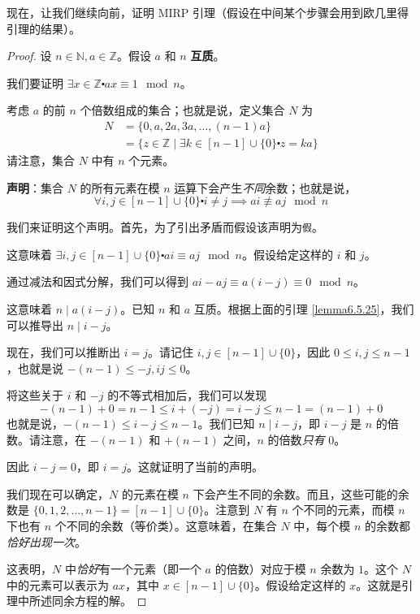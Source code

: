 现在，让我们继续向前，证明 MIRP 引理（假设在中间某个步骤会用到欧几里得引理的结果）。

\begin{proof}
    设 $n \in \mathbb{N}, a \in \mathbb{Z}$。假设 $a$ 和 $n$ \textbf{互质}。
    
    我们要证明 $\exists x \in \mathbb{Z} \centerdot ax \equiv 1 \mod n$。

    考虑 $a$ 的前 $n$ 个倍数组成的集合；也就是说，定义集合 $N$ 为
    \begin{align*}
        N &= \{0, a, 2a, 3a, \dots ,(n-1)a\} \\
        &= \{z \in \mathbb{Z} \mid \exists k \in [n - 1] \cup \{0\} \centerdot z = ka\}
    \end{align*}
    请注意，集合 $N$ 中有 $n$ 个元素。

    \textbf{声明}：集合 $N$ 的所有元素在模 $n$ 运算下会产生\emph{不同}余数；也就是说，
    \[\forall i, j \in [n-1] \cup \{0\} \centerdot i \ne j \implies ai \not\equiv aj \mod n\]

    我们来证明这个声明。首先，为了引出矛盾而假设该声明为\verb|假|。

    这意味着 $\exists i, j \in [n-1] \cup \{0\} \centerdot ai \equiv aj \mod n$。假设给定这样的 $i$ 和 $j$。

    通过减法和因式分解，我们可以得到 $ai - aj \equiv a(i-j) \equiv 0 \mod n$。

    这意味着 $n \mid a(i-j)$。已知 $n$ 和 $a$ 互质。根据上面的引理 \ref{lemma6.5.25}，我们可以推导出 $n \mid i-j$。

    现在，我们可以推断出 $i = j$。请记住 $i, j \in [n-1] \cup \{0\}$，因此 $0 \le i, j \le n-1$，也就是说 $-(n-1) \le -j, ij \le 0$。

    将这些关于 $i$ 和 $-j$ 的不等式相加后，我们可以发现
    \[-(n-1) + 0 = n-1 \le i + (-j) = i - j \le n - 1 = (n-1) + 0\]
    也就是说，$-(n-1) \le i-j \le n-1$。我们已知 $n \mid i - j$，即 $i-j$ 是 $n$ 的倍数。请注意，在 $-(n-1)$ 和 $+(n-1)$ 之间，$n$ 的倍数\emph{只有} $0$。

    因此 $i-j=0$，即 $i=j$。这就证明了当前的声明。

    我们现在可以确定，$N$ 的元素在模 $n$ 下会产生不同的余数。而且，这些可能的余数是 $\{0, 1, 2, \dots, n-1\} = [n-1] \cup \{0\}$。注意到 $N$ 有 $n$ 个不同的元素，而模 $n$ 下也有 $n$ 个不同的余数（等价类）。这意味着，在集合 $N$ 中，每个模 $n$ 的余数都\emph{恰好出现一次}。

    这表明，$N$ 中\emph{恰好}有一个元素（即一个 $a$ 的倍数）对应于模 $n$ 余数为 $1$。这个 $N$ 中的元素可以表示为 $ax$，其中 $x \in [n-1] \cup \{0\}$。假设给定这样的 $x$。这就是引理中所述同余方程的解。
\end{proof}

